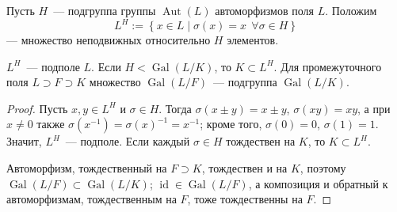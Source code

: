 \documentclass[12pt]{article}
\begin{document}
	\begin{definition}\label{def:fixed-field}
		Пусть $H$~--- подгруппа группы $\operatorname{Aut}(L)$ автоморфизмов поля $L$. Положим
		\[
			L^H := \left\{ x \in L \mid \sigma(x) = x \ \ \forall \sigma \in H \right\}
		\]
		--- множество неподвижных относительно $H$ элементов.
	\end{definition}

	\begin{statement}\label{stat:fixed-field-subfield}
		$L^H$~--- подполе $L$. Если $H < \operatorname{Gal}(L/K)$, то $K \subset L^H$. Для промежуточного поля $L \supset F \supset K$ множество $\operatorname{Gal}(L/F)$~--- подгруппа $\operatorname{Gal}(L/K)$.
	\end{statement}
	\begin{proof}
		Пусть $x, y \in L^H$ и $\sigma \in H$. Тогда $\sigma(x \pm y) = x \pm y$, $\sigma(xy) = xy$, а при $x \ne 0$ также $\sigma(x^{-1}) = \sigma(x)^{-1} = x^{-1}$; кроме того, $\sigma(0)=0$, $\sigma(1)=1$. Значит, $L^H$~--- подполе. Если каждый $\sigma \in H$ тождествен на $K$, то $K \subset L^H$.

		Автоморфизм, тождественный на $F \supset K$, тождествен и на $K$, поэтому $\operatorname{Gal}(L/F) \subset \operatorname{Gal}(L/K)$; $\operatorname{id} \in \operatorname{Gal}(L/F)$, а композиция и обратный к автоморфизмам, тождественным на $F$, тоже тождественны на $F$.
	\end{proof}
\end{document}
